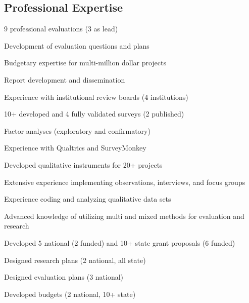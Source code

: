 \subsection{Professional Expertise}
    \begin{cvtable}
            {\color{cvsectioncolor}{Evaluation Planning and Implementation}}
            {}
            {\begin{tightitemize}
                \item 9 professional evaluations (3 as lead)
                \item Development of evaluation questions and plans
                \item Budgetary expertise for multi-million dollar projects
                \item Report development and dissemination 
                \item Experience with institutional review boards (4 institutions)
            \end{tightitemize}}
        \cvitem{}
            {\color{cvsectioncolor}{Survey Development and Validation}}
            {}
            {\begin{tightitemize}
                \item 10+ developed and 4 fully validated surveys (2 published)
                \item Factor analyses (exploratory and confirmatory)
                \item Experience with Qualtrics and SurveyMonkey
            \end{tightitemize}}
        \cvitem{}
            {\color{cvsectioncolor}{Qualitative Research}}
            {}
            {\begin{tightitemize}
                \item Developed qualitative instruments for 20+ projects
                \item Extensive experience implementing observations, interviews, and focus groups
                \item Experience coding and analyzing qualitative data sets
                \item Advanced knowledge of utilizing multi and mixed methods for evaluation and research
            \end{tightitemize}}
            {\color{cvsectioncolor}{Grant Proposal Development}}
            {}
            {\begin{tightitemize}
                \item Developed 5 national (2 funded) and 10+ state grant proposals (6 funded)
                \item Designed research plans (2 national, all state)
                \item Designed evaluation plans (3 national)
                \item Developed budgets (2 national, 10+ state)
            \end{tightitemize}}
    \end{cvtable}